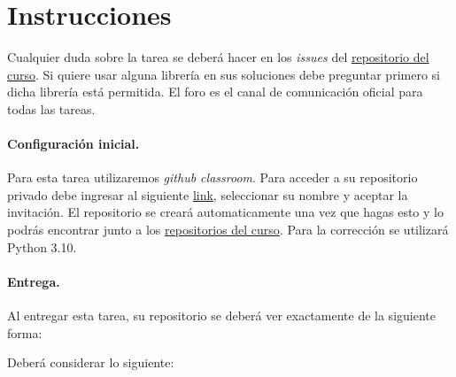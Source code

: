 
\section*{Instrucciones}

Cualquier duda sobre la tarea se deberá hacer en los \emph{issues} del \href{https://github.com/IIC3253/2023}{repositorio del curso}. Si quiere usar alguna librería en sus soluciones debe preguntar primero si dicha librería está permitida. El foro es el canal de comunicación oficial para todas las tareas.

\paragraph{Configuración inicial.} 
Para esta tarea utilizaremos \textit{github classroom}. 
Para acceder a su repositorio privado debe ingresar al siguiente \href{https://classroom.github.com/a/DUgoiX74}{link}, seleccionar su nombre y aceptar la invitación.
El repositorio se creará automaticamente una vez que hagas esto y lo podrás encontrar junto a los \href{https://github.com/orgs/IIC3253/repositories}{repositorios del curso}.
Para la corrección se utilizará Python 3.10.

\paragraph{Entrega.} Al entregar esta tarea, su repositorio se deberá ver exactamente de la siguiente forma:

\bigskip


\bigskip

Deberá considerar lo siguiente:

